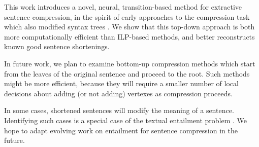 \documentclass[11pt,a4paper]{article}
\begin{document}
This work introduces a novel, neural, transition-based method for extractive sentence compression, in the spirit of early approaches to the compression task which also modified syntax trees \cite{Jing2000SentenceRF,Knight2000StatisticsBasedS}. We show that this top-down approach is both more computationally efficient than ILP-based methods, and better reconstructs known good sentence shortenings. 

In future work, we plan to examine bottom-up compression methods which start from the leaves of the original sentence and proceed to the root.  Such methods might be more efficient, because they will require a smaller number of local decisions about adding (or not adding) vertexes as compression proceeds.

In some cases, shortened sentences will modify the meaning of a sentence. Identifying such cases is a special case of the textual entailment problem \cite{Nayak2014ADO,snli_bowman,Pavlick2016SoCalledNA,linzencompression,annotation_artifacts_snli}. We hope to adapt evolving work on entailment for sentence compression in the future.  






\end{document}
